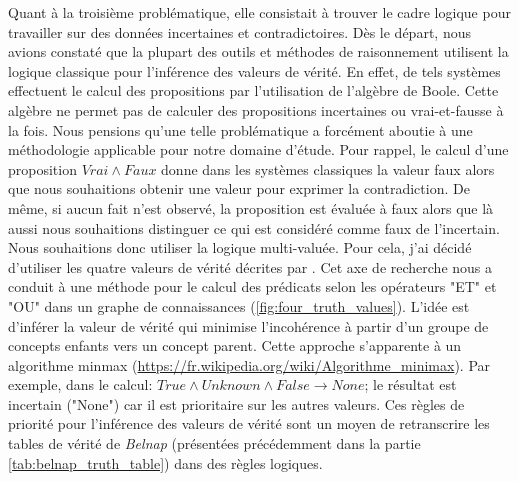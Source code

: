 \begin{refsegment}
Quant à la troisième problématique, elle consistait à trouver le cadre logique pour travailler sur des données incertaines et contradictoires. Dès le départ, nous avions constaté que la plupart des outils et méthodes de raisonnement utilisent la logique classique pour l'inférence des valeurs de vérité. En effet, de tels systèmes effectuent le calcul des propositions par l'utilisation de l'algèbre de Boole. Cette algèbre ne permet pas de calculer des propositions incertaines ou vrai-et-fausse à la fois. Nous pensions qu'une telle problématique a forcément aboutie à une méthodologie applicable pour notre domaine d'étude. Pour rappel, le calcul d'une proposition $Vrai \land Faux$ donne dans les systèmes classiques la valeur faux alors que nous souhaitions obtenir une valeur pour exprimer la contradiction. De même, si aucun fait n’est observé, la proposition est évaluée à faux alors que là aussi nous souhaitions distinguer ce qui est considéré comme faux de l'incertain. Nous souhaitions donc utiliser la logique multi-valuée. Pour cela, j’ai décidé d’utiliser les quatre valeurs de vérité décrites par \citeauthor{belnap77}\cite{belnap77}. Cet axe de recherche nous a conduit à une méthode pour le calcul des prédicats selon les opérateurs "ET" et "OU" dans un graphe de connaissances (\cref{fig:four_truth_values}). L'idée est d'inférer la valeur de vérité qui minimise l'incohérence à partir  d'un groupe de concepts enfants vers un concept parent. Cette approche s'apparente à un algorithme minmax \cite{aho1989} (\url{https://fr.wikipedia.org/wiki/Algorithme_minimax}). Par exemple, dans le calcul: $ True \land Unknown \land False \to None$; le résultat est incertain ("None") car il est prioritaire sur les autres valeurs. Ces règles de priorité pour l'inférence des valeurs de vérité sont un moyen de retranscrire les tables de vérité de \textit{Belnap} (présentées précédemment dans la partie  \cref{tab:belnap_truth_table}) dans des règles logiques.


\end{refsegment}
